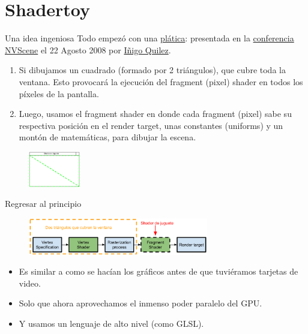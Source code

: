 \section{Shadertoy}

\begin{frame}{Una idea ingeniosa}
Todo empezó con una \href{https://iquilezles.org/articles/nvscene2008/rwwtt.pdf}{plática}:  presentada en la \href{https://www.youtube.com/watch?v=A1iW6Z_Jc4k}{conferencia NVScene} el 22 Agosto 2008 por \href{https://iquilezles.org/}{Iñigo Quilez}.
\begin{exampleblock}{}
\begin{enumerate}
    \item Si dibujamos un cuadrado (formado por 2 triángulos), que cubre toda la ventana. Esto provocará la ejecución del fragment (pixel) shader en todos los píxeles de la pantalla. 
    \item Luego, usamos el fragment shader en donde cada fragment (pixel) sabe su respectiva posición en el render target, unas constantes (uniforms) y un montón de matemáticas, para dibujar la escena.
\end{enumerate}
\end{exampleblock}
\begin{figure}[htp]
  \centering
  \includegraphics[width=0.2\textwidth]{img/TwoTriangles}
\end{figure}
\end{frame}

\begin{frame}{Regresar al principio}
\begin{figure}[htp]
  \centering
  \includegraphics[width=0.7\textwidth]{img/Truco}
\end{figure}
\begin{itemize}
    \item Es similar a como se hacían los gráficos antes de que tuviéramos tarjetas de video.
    \item Solo que ahora aprovechamos el \alert{inmenso poder paralelo} del GPU.
    \item Y usamos un lenguaje de alto nivel (como GLSL).
\end{itemize}
\end{frame}

